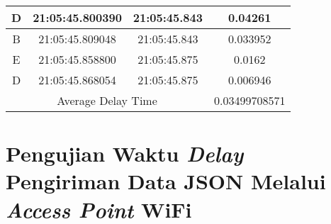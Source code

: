 \begin{longtable}{|ccc|c|}
    \multicolumn{1}{|c|}{D}    & \multicolumn{1}{c|}{21:05:45.800390} & 21:05:45.843       & 0.04261       \\ \hline
    \multicolumn{1}{|c|}{B}    & \multicolumn{1}{c|}{21:05:45.809048} & 21:05:45.843       & 0.033952      \\ \hline
    \multicolumn{1}{|c|}{E}    & \multicolumn{1}{c|}{21:05:45.858800} & 21:05:45.875       & 0.0162        \\ \hline
    \multicolumn{1}{|c|}{D}    & \multicolumn{1}{c|}{21:05:45.868054} & 21:05:45.875       & 0.006946      \\ \hline
    \multicolumn{3}{|c|}{Average Delay Time}                                               & 0.03499708571 \\ \hline
\end{longtable}

\section{Pengujian Waktu \emph{Delay} Pengiriman Data JSON Melalui \emph{Access Point} WiFi}
\label{sec:delayWiFiJSON}

